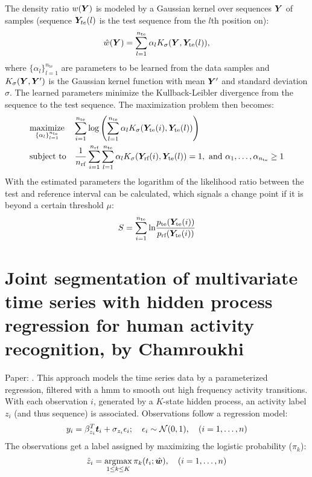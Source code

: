 The density ratio $w(\matrixsym{Y})$ is modeled by a Gaussian kernel over sequences $\matrixsym{Y}$ of samples (sequence $\matrixsym{Y}_{te}(l)$ is the test sequence from the $l$th position on):
%
\begin{equation}
  \hat{w}(\matrixsym{Y}) = \sum_{l=1}^{n_\text{te}} \alpha_l K_\sigma(\matrixsym{Y}, \matrixsym{Y}_\text{te}(l)),
\end{equation}
%
where $\{\alpha_l\}_{l=1}^{n_\text{te}}$ are parameters to be learned from the data samples and $K_\sigma(\matrixsym{Y}, \matrixsym{Y}')$ is the Gaussian kernel function with mean $\matrixsym{Y}'$ and standard deviation $\sigma$.
The learned parameters minimize the Kullback-Leibler divergence from the sequence to the test sequence.
The maximization problem then becomes:
%
\begin{equation}
  \maximize{\{\alpha_l\}_{l=1}^{n_\text{te}}}
    {\sum_{i=1}^{n_\text{te}} \text{log} \left(\sum_{l=1}^{n_\text{te}} \alpha_l K_\sigma(\matrixsym{Y}_\text{te}(i), \matrixsym{Y}_\text{te}(l) ) \right)}
    {\frac{1}{n_\text{rf}} \sum_{i=1}^{n_\text{rf}} \sum_{l=1}^{n_\text{te}} \alpha_l K_\sigma(\matrixsym{Y}_\text{rf}(i), \matrixsym{Y}_\text{te}(l)) = 1, ~ \text{and} ~ \alpha_1, \dots ,\alpha_{n_\text{te}} \geq 1}
\end{equation}
%
With the estimated parameters the logarithm of the likelihood ratio between the test and reference interval can be calculated, which signals a change point if it is beyond a certain threshold $\mu$:
%
\begin{equation}
  S = \sum_{i=1}^{n_\text{te}} \text{ln}
    \frac
    {p_\text{te}(\matrixsym{Y}_\text{te}(i))}
    {p_\text{rf}(\matrixsym{Y}_\text{te}(i))}
\end{equation}







\clearpage
\section{Joint segmentation of multivariate time series with hidden process regression for human activity recognition, by Chamroukhi}
Paper: \cite{chamroukhi2013joint}.
This approach models the time series data by a parameterized regression, filtered with a \gls{hmm} to smooth out high frequency activity transitions.
With each observation $i$, generated by a $K$-state hidden process, an activity label $z_i$ (and thus sequence) is associated.
Observations follow a regression model:
%
\begin{equation}
  y_i = \beta_{z_i}^T \vectorsym{t}_i + \sigma_{z_i} \epsilon_i; \quad \epsilon_i \sim \mathcal{N}(0,1), \quad (i=1, \dots ,n)
\end{equation}
%
The observations get a label assigned by maximizing the logistic probability ($\pi_k$):
%
\begin{equation}
  \hat{z}_i = \argmaxold \limits_{1 \leq k \leq K} \pi_k (t_i; \hat{\vectorsym{w}}), \quad (i=1, \dots, n)
\end{equation}
%






